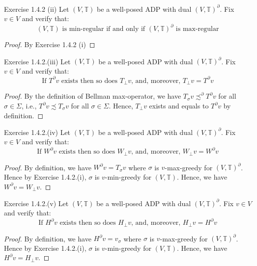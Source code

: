 \documentclass[aspectratio=169]{beamer} %
\begin{document}
\begin{frame}{Exercise 1.4.2 (ii)}
   Let $(V,\mathbb{T})$ be a well-posed ADP with dual $(V,\mathbb{T})^\partial$. Fix $v\in V$ and verify that:
   $$
   (V,\mathbb{T}) \text{ is min-regular if and only if $(V,\mathbb{T})^\partial$ is max-regular}
   $$
   \begin{proof}
       By Exercise 1.4.2 (i)
   \end{proof}
\end{frame}

\begin{frame}{Exercise 1.4.2.(iii)}
    Let $(V,\mathbb{T})$ be a well-posed ADP with dual $(V,\mathbb{T})^\partial$. Fix $v\in V$ and verify that:
    $$
\text{If $T^\partial v$ exists then so does $T_\perp v$, and, moreover, $T_\perp v = T^\partial v$}
    $$
    \begin{proof}
        By the definition of Bellman max-operator, we have $T_\sigma v\precsim^\partial T^\partial v$ for all $\sigma\in\Sigma$, i.e., $T^\partial v\precsim T_\sigma v$ for all $\sigma \in\Sigma$. Hence, $T_\perp v$ exists and equals to $T^\partial v$ by definition.
    \end{proof}
\end{frame}

\begin{frame}{Exercise 1.4.2.(iv)}
    Let $(V,\mathbb{T})$ be a well-posed ADP with dual $(V,\mathbb{T})^\partial$. Fix $v\in V$ and verify that:
    $$
\text{If $W^\partial v$ exists then so does $W_\perp v$, and, moreover, $W_\perp v = W^\partial v$}
    $$
    \begin{proof}
    By definition, we have $W^\partial v = T_\sigma v$ where $\sigma$ is $v$-max-greedy for $(V,\mathbb{T})^\partial$. Hence by Exercise 1.4.2.(i), $\sigma$ is $v$-min-greedy for $(V,\mathbb{T})$. Hence, we have $W^\partial v = W_\perp v$.
\end{proof}
\end{frame}

\begin{frame}{Exercise 1.4.2.(v)}
    Let $(V,\mathbb{T})$ be a well-posed ADP with dual $(V,\mathbb{T})^\partial$. Fix $v\in V$ and verify that:
    $$
\text{If $H^\partial v$ exists then so does $H_\perp v$, and, moreover, $H_\perp v = H^\partial v$}
    $$
    \begin{proof}
    By definition, we have $H^\partial v = v_\sigma$ where $\sigma$ is $v$-max-greedy for $(V,\mathbb{T})^\partial$. Hence by Exercise 1.4.2.(i), $\sigma$ is $v$-min-greedy for $(V,\mathbb{T})$. Hence, we have $H^\partial v = H_\perp v$.
\end{proof}
\end{frame}
\end{document}
